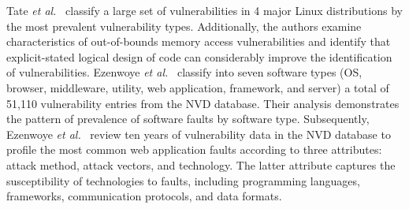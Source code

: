 \par
Tate \textit{et al.}~\cite{Tate2020CharacterizingVI} classify a large set of vulnerabilities in 4 major Linux distributions by the most prevalent vulnerability types. Additionally, the authors examine characteristics of out-of-bounds memory access vulnerabilities and identify that explicit-stated logical design of code can considerably improve the identification of vulnerabilities. Ezenwoye \textit{et al.}~\cite{Ezenwoye2020ClassifyingCS} classify into seven software types (OS, browser, middleware, utility, web application, framework, and server) a total of 51,110 vulnerability entries from the NVD database. Their analysis demonstrates the pattern of prevalence of software faults by software type. Subsequently, Ezenwoye \textit{et al.}~\cite{Ezenwoye2022WebAW} review ten years of vulnerability data in the NVD database to profile the most common web application faults according to three attributes: attack method, attack vectors, and technology. The latter attribute captures the susceptibility of technologies to faults, including programming languages, frameworks, communication protocols, and data formats.

